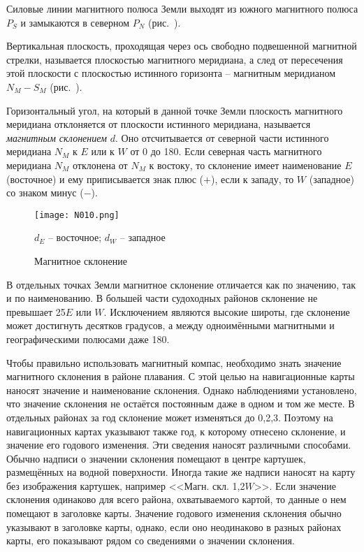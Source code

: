 Силовые линии магнитного полюса Земли выходят из южного магнитного
полюса $P_S$ и замыкаются в северном $P_N$ (рис.~).

Вертикальная плоскость, проходящая через ось свободно подвешенной
магнитной стрелки, называется плоскостью магнитного меридиана, а след
от пересечения этой плоскости с плоскостью истинного горизонта \---
магнитным меридианом $N_M - S_M$ (рис.~).

Горизонтальный угол, на который в данной точке Земли плоскость
магнитного меридиана отклоняется от плоскости истинного меридиана,
называется \textit{магнитным склонением}
$d$. Оно отсчитывается от северной части истинного меридиана $N_M$ к
$E$ или к $W$ от 0 до 180\gr. Если северная часть магнитного меридиана
$N_M$ отклонена от $N_M$ к востоку, то склонение имеет наименование
$E$ (восточное) и ему приписывается знак плюс ($+$), если к западу, то
$W$ (западное) со знаком минус ($-$).

\begin{figure}[htb]
  \centering{}
  \texttt{[image: N010.png]}
  \caption{Магнитное склонение}
  \label{fig:N10}
  \small
  \centering{}
  $d_E$ \--- восточное; $d_W$ \--- западное
\end{figure}

В отдельных точках Земли магнитное склонение отличается как по
значению, так и по наименованию. В большей части судоходных районов
склонение не превышает 25\gr $E$ или $W$. Исключением являются высокие
широты, где склонение может достигнуть десятков градусов, а между
одноимёнными магнитными и географическими полюсами даже 180\gr.

Чтобы правильно использовать магнитный компас, необходимо знать
значение магнитного склонения в районе плавания. С этой целью на
навигационные карты наносят значение и наименование склонения. Однако
наблюдениями установлено, что значение склонения не остаётся
постоянным даже в одном и том же месте. В отдельных районах за год
склонение может изменяться до 0,2,3\gr. Поэтому на
навигационных картах указывают также год, к которому отнесено
склонение, и значение его годового изменения. Эти сведения наносят
различными способами. Обычно надписи о значении склонения помещают в
центре картушек, размещённых на водной поверхности. Иногда такие же
надписи наносят на карту без изображения картушек, например
<<Магн. скл. 1,2\gr $W$>>. Если значение склонения одинаково для всего
района, охватываемого картой, то данные о нем помещают в заголовке
карты. Значение годового изменения склонения обычно указывают в
заголовке карты, однако, если оно неодинаково в разных районах карты,
его показывают рядом со сведениями о значении склонения.

